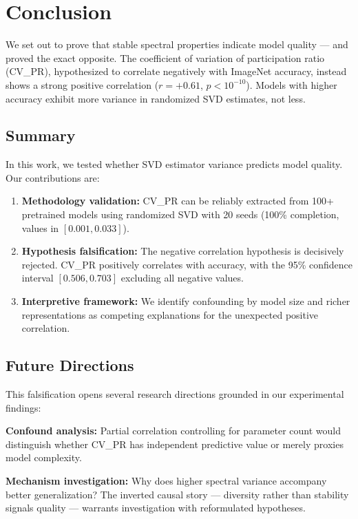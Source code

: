\section{Conclusion}
\label{sec:conclusion}

We set out to prove that stable spectral properties indicate model quality --- and proved the exact opposite. The coefficient of variation of participation ratio (CV\_PR), hypothesized to correlate negatively with ImageNet accuracy, instead shows a strong positive correlation ($r = +0.61$, $p < 10^{-10}$). Models with higher accuracy exhibit more variance in randomized SVD estimates, not less.

\subsection{Summary}

In this work, we tested whether SVD estimator variance predicts model quality. Our contributions are:

\begin{enumerate}
    \item \textbf{Methodology validation:} CV\_PR can be reliably extracted from 100+ pretrained models using randomized SVD with 20 seeds (100\% completion, values in $[0.001, 0.033]$).

    \item \textbf{Hypothesis falsification:} The negative correlation hypothesis is decisively rejected. CV\_PR positively correlates with accuracy, with the 95\% confidence interval $[0.506, 0.703]$ excluding all negative values.

    \item \textbf{Interpretive framework:} We identify confounding by model size and richer representations as competing explanations for the unexpected positive correlation.
\end{enumerate}

\subsection{Future Directions}

This falsification opens several research directions grounded in our experimental findings:

\textbf{Confound analysis:} Partial correlation controlling for parameter count would distinguish whether CV\_PR has independent predictive value or merely proxies model complexity.

\textbf{Mechanism investigation:} Why does higher spectral variance accompany better generalization? The inverted causal story --- diversity rather than stability signals quality --- warrants investigation with reformulated hypotheses.

